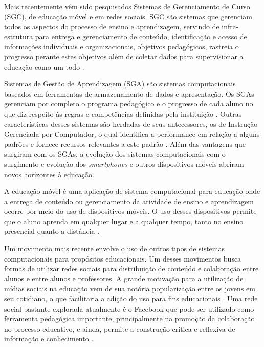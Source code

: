Mais recentemente vêm sido pesquisados Sistemas de Gerenciamento de Curso (SGC), de educação móvel e em redes sociais. SGC são sistemas que gerenciam todos os aspectos do processo de ensino e aprendizagem, servindo de infra-estrutura para entrega e gerenciamento de conteúdo, identificação e acesso de informações individuais e organizacionais, objetivos pedagógicos, rastreia o progresso perante estes objetivos além de coletar dados para supervisionar a educação como um todo \cite{flescher02}.

Sistemas de Gestão de Aprendizagem (SGA) são sistemas computacionais baseados em ferramentas de armazenamento de dados e apresentação. Os SGAs gerenciam por completo o programa pedagógico e o progresso de cada aluno no que diz respeito às regras e competências definidas pela instituição \cite{flescher02}. Outras características desses sistemas são herdadas de seus antecessores, os de Instrução Gerenciada por Computador, o qual identifica a performance em relação a alguns padrões e fornece recursos relevantes a este padrão \cite{flescher02}. Além das vantagens que surgiram com os SGAs, a evolução dos sistemas computacionais com o surgimento e evolução dos \emph{smartphones} e outros dispositivos móveis abriram novos horizontes à educação.


A educação móvel é uma aplicação de sistema computacional para educação onde a entrega de conteúdo ou gerenciamento da atividade de ensino e aprendizagem ocorre por meio do uso de dispositivos móveis. O uso desses dispositivos permite que o aluno aprenda em qualquer lugar e a qualquer tempo, tanto no ensino presencial quanto a distância \cite{mlearning09}.

Um movimento mais recente envolve o uso de outros tipos de sistemas computacionais para propósitos educacionais. Um desses movimentos busca formas de utilizar redes sociais para distribuição de conteúdo e colaboração entre alunos e entre alunos e professores. A grande motivação para a utilização de mídias sociais na educação vem de sua notória popularização entre os jovens em seu cotidiano, o que facilitaria a adição do uso para fins educacionais \cite{dotta_uso_2011}. Uma rede social bastante explorada atualmente é o Facebook que pode ser utilizado como ferramenta pedagógica importante, principalmente na promoção da colaboração no processo educativo, e ainda, permite a construção crítica e reflexiva de informação e conhecimento \cite{facebook11}.

